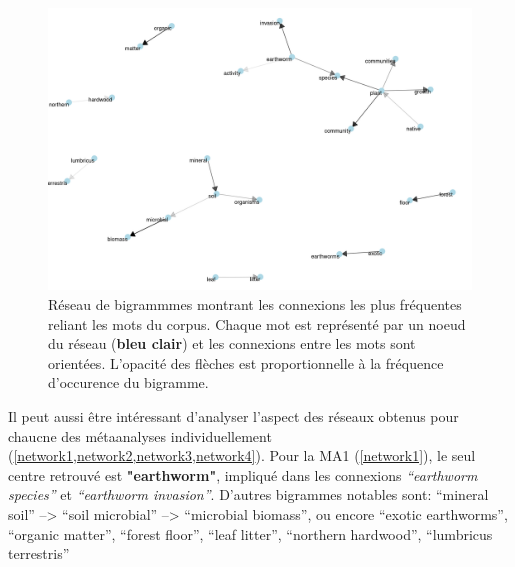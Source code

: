 \documentclass{book}
\begin{document}
\begin{figure}[htb] %
    \begin{center} %
        \includegraphics[width=1\textwidth]{network_all_(oriented).png}
        \caption[Réseau de bigrammmes orienté montrant les connexions les plus fréquentes reliant les mots du corpus.]{Réseau de bigrammmes montrant les connexions les plus fréquentes reliant les mots du corpus. Chaque mot est représenté par un noeud du réseau (\textbf{bleu clair}) et les connexions entre les mots sont orientées. L'opacité des flèches est proportionnelle à la fréquence d'occurence du bigramme.\label{network}}
    \end{center}  
\end{figure}
\FloatBarrier{}


\newpage
Il peut aussi être intéressant d'analyser l'aspect des réseaux obtenus pour chaucne des métaanalyses individuellement (\cref*{network1,network2,network3,network4}). Pour la MA1 (\cref{network1}), le seul centre retrouvé est \textbf{"earthworm"}, impliqué dans les connexions \textit{“earthworm species”} et \textit{ “earthworm invasion”}. D'autres bigrammes notables sont: “mineral soil” –> “soil microbial” –> “microbial biomass”, ou encore “exotic earthworms”, “organic matter”, “forest floor”, “leaf litter”, “northern hardwood”, “lumbricus terrestris”
\end{document}
